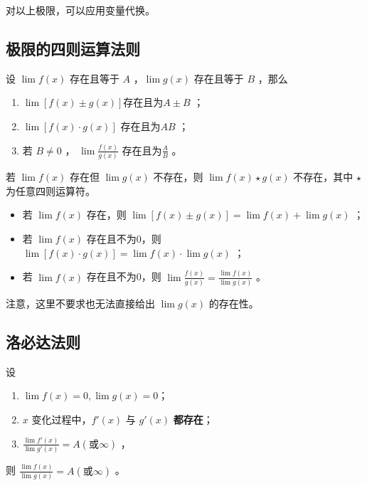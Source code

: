 对以上极限，可以应用变量代换。

\subsection{极限的四则运算法则}

设 $ \lim f(x) $ 存在且等于 $ A $ ，$ \lim g(x) $ 存在且等于 $ B $ ，那么
\begin{enumerate}
    \item $ \lim[f(x)\pm g(x)]$存在且为$A\pm B $ ；
    \item $ \lim[f(x)\cdot{} g(x)]$ 存在且为$ AB $ ；
    \item 若 $ B\neq0 $ ， $ \lim\frac{f(x)}{g(x)} $ 存在且为$ \frac AB $ 。
\end{enumerate}

若 $ \lim f(x) $ 存在但 $ \lim g(x) $ 不存在，则 $ \lim f(x)\star g(x) $ 不存在，其中 $ \star $ 为任意四则运算符。

\begin{Field}[广义极限四则运算]

    \begin{itemize}
        \item 若 $ \lim f(x) $ 存在，则 $ \lim [f(x)\pm g(x)]=\lim f(x) + \lim g(x) $ ；
        \item 若 $ \lim f(x) $ 存在且不为0，则 $ \lim [f(x)\cdot{} g(x)]=\lim f(x) \cdot{} \lim g(x) $ ；
        \item 若 $ \lim f(x) $ 存在且不为0，则 $ \lim \frac{f(x)}{g(x)}=\frac{\lim f(x)}{\lim g(x)}$ 。
    \end{itemize}
    注意，这里不要求也无法直接给出 $ \lim g(x) $ 的存在性。
\end{Field}

\subsection{洛必达法则}

\begin{Theo}

    设
    \begin{enumerate}
        \item $ \lim f(x)=0,\lim g(x)=0 $；
        \item $ x $ 变化过程中，$ f'(x) $ 与 $ g'(x) $ \textbf{都存在}；
        \item $ \frac{\lim f'(x)}{\lim g'(x)}=A(\textrm{或}\infty) $ ，
    \end{enumerate}
    则 $ \frac{\lim f(x)}{\lim g(x)}=A(\textrm{或}\infty) $ 。
\end{Theo}

